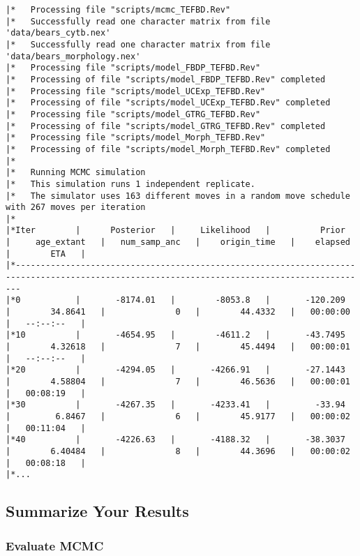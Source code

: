 {\tiny{\tt \begin{snugshade*}
\begin{lstlisting}
|*   Processing file "scripts/mcmc_TEFBD.Rev"
|*   Successfully read one character matrix from file 'data/bears_cytb.nex'
|*   Successfully read one character matrix from file 'data/bears_morphology.nex'
|*   Processing file "scripts/model_FBDP_TEFBD.Rev"
|*   Processing of file "scripts/model_FBDP_TEFBD.Rev" completed
|*   Processing file "scripts/model_UCExp_TEFBD.Rev"
|*   Processing of file "scripts/model_UCExp_TEFBD.Rev" completed
|*   Processing file "scripts/model_GTRG_TEFBD.Rev"
|*   Processing of file "scripts/model_GTRG_TEFBD.Rev" completed
|*   Processing file "scripts/model_Morph_TEFBD.Rev"
|*   Processing of file "scripts/model_Morph_TEFBD.Rev" completed
|*
|*   Running MCMC simulation
|*   This simulation runs 1 independent replicate.
|*   The simulator uses 163 different moves in a random move schedule with 267 moves per iteration
|*
|*Iter        |      Posterior   |     Likelihood   |          Prior   |     age_extant   |   num_samp_anc   |    origin_time   |    elapsed   |        ETA   |
|*---------------------------------------------------------------------------------------------------------------------------------------------
|*0           |       -8174.01   |        -8053.8   |       -120.209   |        34.8641   |              0   |        44.4332   |   00:00:00   |   --:--:--   |
|*10          |       -4654.95   |        -4611.2   |       -43.7495   |        4.32618   |              7   |        45.4494   |   00:00:01   |   --:--:--   |
|*20          |       -4294.05   |       -4266.91   |       -27.1443   |        4.58804   |              7   |        46.5636   |   00:00:01   |   00:08:19   |
|*30          |       -4267.35   |       -4233.41   |         -33.94   |         6.8467   |              6   |        45.9177   |   00:00:02   |   00:11:04   |
|*40          |       -4226.63   |       -4188.32   |       -38.3037   |        6.40484   |              8   |        44.3696   |   00:00:02   |   00:08:18   |
|*...
\end{lstlisting}
\end{snugshade*}}}

\bigskip
\subsection{Summarize Your Results}\label{subsect:RB-SummarizeResults}

\medskip
\subsubsection{Evaluate MCMC}\label{subsub:RB-EvalMCMC}

